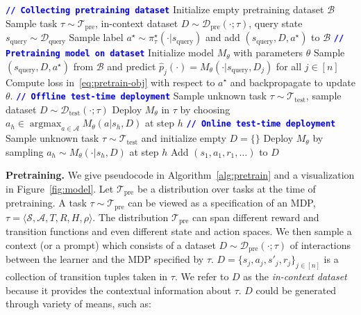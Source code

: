 \documentclass{article}
\newcommand{\Acal}{\mathcal{A}}
\newcommand{\Bcal}{\mathcal{B}}
\newcommand{\Dcal}{\mathcal{D}}
\newcommand{\Scal}{{\mathcal{S}}}
\newcommand{\Tcal}{{\mathcal{T}}}
\newcommand*{\argmax}{\mathop{\mathrm{argmax}}}
\newcommand{\algcomment}[1]{\textcolor{blue}{\footnotesize{\texttt{\textbf{// #1}}}}}
\newcommand{\pretraind}{\Dcal_{\text{pre}}}
\newcommand{\pretraint}{\Tcal_{\text{pre}}}
\newcommand{\testt}{\Tcal_{\text{test}}}
\newcommand{\testd}{\Dcal_{\text{test}}}
\newcommand{\squery}{s_{\text{query}}}
\newcommand{\Dquery}{\Dcal_{\text{query}}}
\newcommand{\pistar}{\pi^{\star}}
\begin{document}
\begin{algorithm}
\caption{Decision-Pretrained Transformer (DPT): Training and Deployment}         \label{alg:pretrain}
\begin{algorithmic}[1]
		\STATE \algcomment{Collecting pretraining dataset}
        \STATE Initialize empty pretraining dataset $\Bcal$
            \STATE Sample task $\tau \sim \pretraint$,  in-context dataset $D \sim \pretraind (\cdot ; \tau)$, query state $\squery \sim \Dquery$
            \STATE Sample label $a^\star \sim \pistar_\tau(\cdot | \squery)$
            and add $(\squery, D, a^\star)$ to $\Bcal$
        \ENDFOR
        \STATE \algcomment{Pretraining model on dataset}
        \STATE Initialize model $M_{\theta}$ with parameters $\theta$
            \STATE Sample $(\squery, D, a^\star)$ from $\Bcal$ and predict $\hat p_j(\cdot) = M_{\theta}(\cdot  | \squery, D_j)$ for all $j \in [n]$
            \STATE Compute loss in~\eqref{eq:pretrain-obj} with respect to $a^\star$ and backpropagate to update $\theta$.
        \ENDWHILE
        \STATE \algcomment{Offline test-time deployment}
        \STATE Sample unknown task $\tau \sim \testt$, sample dataset $D \sim \testd(\cdot; \tau)$
        \STATE Deploy $M_{\theta}$ in $\tau$ by choosing $a_h \in \argmax_{a \in \Acal} M_{\theta}(a | s_h, D)$ at step $h$
        \STATE \algcomment{Online test-time deployment}
        \STATE Sample unknown task $\tau \sim \testt$ and initialize empty $D = \{\}$
                \STATE Deploy $M_{\theta}$ by sampling $a_h \sim M_{\theta}(\cdot  | s_h, D)$ at step $h$
                \STATE Add $(s_1, a_1, r_1, \ldots)$ to $D$
        \ENDFOR
\end{algorithmic}
\end{algorithm}
\textbf{Pretraining.} We give pseudocode in Algorithm~\ref{alg:pretrain} and a visualization in Figure~\ref{fig:model}. Let $\pretraint$ be a distribution over tasks at the time of pretraining. A task $\tau \sim \pretraint$ can be viewed as a specification of an MDP,
$\tau = \langle
\Scal, \Acal, T, R, H, \rho \rangle$. The distribution $\pretraint$ can
span different reward and transition functions and even different state and action spaces. We then sample a context (or a prompt) which consists of a dataset $D \sim \pretraind(\cdot; \tau)$ of interactions between the learner and the MDP specified by $\tau$. $D = \{s_j,a_j, s'_j, r_j\}_{j \in [n]}$ is a collection of transition tuples taken in $\tau$.
We refer to $D$ as the \emph{in-context dataset} because it provides the contextual information about $\tau$. $D$ could be generated through variety of means, such as:
\end{document}
